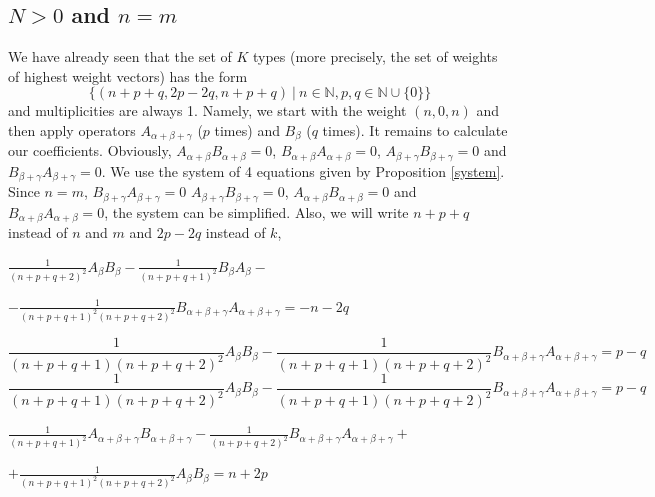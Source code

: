 \documentclass[twoside,a4paper,12pt]{article}
\newcommand{\N}{\ensuremath{\mathbb N}}
\theoremstyle{definition}
\newcommand{\ds}{\displaystyle}
\begin{document}
\subsection{\texorpdfstring{$N>0$ and $n=m$}{N greater than 0 and n=m}}

We have already seen that the set of $K$ types (more precisely, the set of
weights of highest weight vectors) has the form
\begin{equation}\label{weights}
	\{(n+p+q,2p-2q,n+p+q)\:|\:n\in\N,p,q\in\N\cup\{0\}\}
\end{equation}
and multiplicities are always 1. Namely, we start with the weight $(n,0,n)$
and then apply operators $A_{\alpha+\beta+\gamma}$ ($p$ times) and
$B_\beta$ ($q$ times). It remains to calculate our coefficients.
Obviously, $A_{\alpha+\beta}B_{\alpha+\beta}=0$,
$B_{\alpha+\beta}A_{\alpha+\beta}=0$, $A_{\beta+\gamma}B_{\beta+\gamma}=0$ and
$B_{\beta+\gamma}A_{\beta+\gamma}=0$.
We use the system of 4 equations given by Proposition \ref{system}.
Since $n=m$, $B_{\beta+\gamma}A_{\beta+\gamma}=0$
$A_{\beta+\gamma}B_{\beta+\gamma}=0$,
$A_{\alpha+\beta}B_{\alpha+\beta}=0$ and
$B_{\alpha+\beta}A_{\alpha+\beta}=0$, the system can be simplified.
Also, we will write
$n+p+q$ instead of $n$ and $m$ and $2p-2q$ instead of $k$,
\begin{flushleft}
	$\ds \frac1{(n+p+q+2)^2}A_\beta B_\beta-
	\frac1{(n+p+q+1)^2}B_\beta A_\beta-$
\end{flushleft}
\begin{flushright}
	$\ds -\frac1{(n+p+q+1)^2(n+p+q+2)^2}
	B_{\alpha+\beta+\gamma}A_{\alpha+\beta+\gamma}=-n-2q$
\end{flushright}
\begin{equation*}
	\frac1{(n+p+q+1)(n+p+q+2)^2}A_\beta B_\beta-\frac1{(n+p+q+1)(n+p+q+2)^2}
	B_{\alpha+\beta+\gamma}A_{\alpha+\beta+\gamma}=p-q
\end{equation*}
\begin{equation*}
	\frac1{(n+p+q+1)(n+p+q+2)^2}A_\beta B_\beta-\frac1{(n+p+q+1)(n+p+q+2)^2}
	B_{\alpha+\beta+\gamma}A_{\alpha+\beta+\gamma}=p-q
\end{equation*}
\begin{flushleft}
	$\ds \frac1{(n+p+q+1)^2}A_{\alpha+\beta+\gamma}B_{\alpha+\beta+\gamma}
	-\frac1{(n+p+q+2)^2}B_{\alpha+\beta+\gamma}A_{\alpha+\beta+\gamma}+$
\end{flushleft}
\begin{flushright}
	$\ds +\frac1{(n+p+q+1)^2(n+p+q+2)^2}A_\beta B_\beta=n+2p$
\end{flushright}
\end{document}
